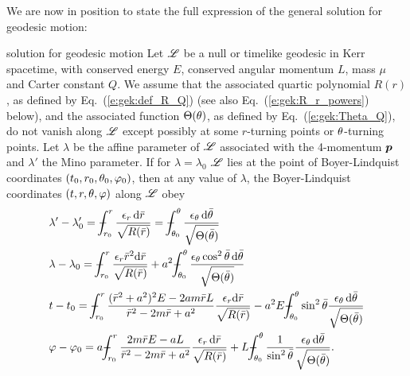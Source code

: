 We are now in position to state the full expression of the general
solution for geodesic motion:
\begin{tprop}{solution for geodesic motion}{}
Let $\mathscr{L}$ be a null or timelike geodesic in Kerr spacetime,
with conserved energy $E$, conserved angular momentum $L$, mass $\mu$ and
Carter constant $Q$. We assume that the associated quartic polynomial $R(r)$,
as defined by Eq.~(\ref{e:gek:def_R_Q}) (see also Eq.~(\ref{e:gek:R_r_powers}) below),
and the associated function $\Theta(\theta)$, as defined by Eq.~(\ref{e:gek:Theta_Q}),
do not vanish along $\mathscr{L}$ except possibly at some $r$-turning points or
$\theta$-turning points.
Let $\lambda$ be the affine parameter of $\mathscr{L}$
associated with the 4-momentum $\bm{p}$ and $\lambda'$ the
Mino parameter. If for $\lambda=\lambda_0$
$\mathscr{L}$ lies at the point of Boyer-Lindquist coordinates $(t_0,r_0,\theta_0,\varphi_0)$,
then at any value of $\lambda$, the Boyer-Lindquist coordinates $(t,r,\theta,\varphi)$ along $\mathscr{L}$
obey
\begin{subequations}
\label{e:gek:integrated_eqs}
\begin{align}
 & \lambda' - \lambda'_0 = \dashint_{r_0}^r \frac{\eps_r \, \D \bar{r}}{\sqrt{R(\bar{r})}}
   = \dashint_{\th_0}^\th \frac{\eps_\th \, \D \bar{\th}}{\sqrt{\Theta(\bar{\th})}}
    \label{e:gek:integr_Mino}\\
 & \lambda - \lambda_0 = \dashint_{r_0}^r \frac{\eps_r \bar{r}^2 \D \bar{r}}{\sqrt{R(\bar{r})}}
    + a^2 \dashint_{\th_0}^\th \frac{\eps_\th \cos^2\bar{\th} \, \D \bar{\th}}{\sqrt{\Theta(\bar{\th})}}
    \label{e:gek:integr_lambda} \\
 & t - t_0 = \dashint_{r_0}^r  \frac{(\bar{r}^2 + a^2)^2 E - 2 a m \bar{r} L}{\bar{r}^2 - 2m\bar{r} + a^2} \frac{\eps_r\D \bar{r}}{\sqrt{R(\bar{r})}}
 - a^2 E \dashint_{\th_0}^\th  \sin^2\bar{\th}  \frac{\eps_\th \, \D \bar{\th}}{\sqrt{\Theta(\bar{\th})}} \label{e:gek:integr_t} \\
 & \ph - \ph_0 = a \dashint_{r_0}^r  \frac{2m\bar{r} E - a L}{\bar{r}^2 - 2m \bar{r} + a^2}
    \frac{\eps_r \, \D \bar{r}}{\sqrt{R(\bar{r})}}
    + L \dashint_{\th_0}^\th \frac{1}{\sin^2\bar{\th}} \frac{\eps_\th \, \D \bar{\th}}{\sqrt{\Theta(\bar{\th})}} . \label{e:gek:integr_ph}
\end{align}
\end{subequations}
\end{tprop}

